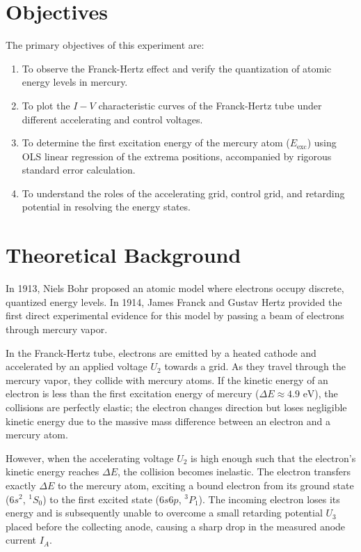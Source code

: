 \documentclass[a4paper,11pt]{article}
\begin{document}
\section{Objectives}
The primary objectives of this experiment are:
\begin{enumerate}
    \item To observe the Franck-Hertz effect and verify the quantization of atomic energy levels in mercury.
    \item To plot the $I-V$ characteristic curves of the Franck-Hertz tube under different accelerating and control voltages.
    \item To determine the first excitation energy of the mercury atom ($E_{\text{exc}}$) using OLS linear regression of the extrema positions, accompanied by rigorous standard error calculation.
    \item To understand the roles of the accelerating grid, control grid, and retarding potential in resolving the energy states.
\end{enumerate}

\section{Theoretical Background}
In 1913, Niels Bohr proposed an atomic model where electrons occupy discrete, quantized energy levels. In 1914, James Franck and Gustav Hertz provided the first direct experimental evidence for this model by passing a beam of electrons through mercury vapor. 

In the Franck-Hertz tube, electrons are emitted by a heated cathode and accelerated by an applied voltage $U_2$ towards a grid. As they travel through the mercury vapor, they collide with mercury atoms. If the kinetic energy of an electron is less than the first excitation energy of mercury ($\Delta E \approx 4.9\text{ eV}$), the collisions are perfectly elastic; the electron changes direction but loses negligible kinetic energy due to the massive mass difference between an electron and a mercury atom.

However, when the accelerating voltage $U_2$ is high enough such that the electron's kinetic energy reaches $\Delta E$, the collision becomes inelastic. The electron transfers exactly $\Delta E$ to the mercury atom, exciting a bound electron from its ground state ($6s^2$, $^1S_0$) to the first excited state ($6s6p$, $^3P_1$). The incoming electron loses its energy and is subsequently unable to overcome a small retarding potential $U_3$ placed before the collecting anode, causing a sharp drop in the measured anode current $I_A$.
\end{document}
